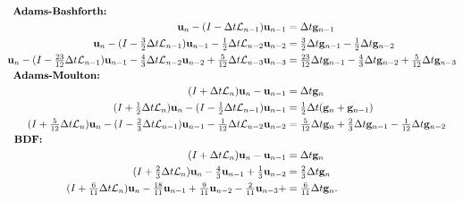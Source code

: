 \documentclass[a4paper,12pt]{article}
\begin{document}
{\small
\begin{align*}
\textnormal{\textbf{Adams-Bashforth:}}\hspace{40.5ex}&\\
\mathbf{u}_n - (I - \Delta t\mathcal{L}_{n-1})\mathbf{u}_{n-1} & =\Delta t\mathbf{g}_{n-1}  \\
\mathbf{u}_n - (I - \tfrac{3}{2}\Delta t\mathcal{L}_{n-1})\mathbf{u}_{n-1} - \tfrac{1}{2}\Delta t\mathcal{L}_{n-2}\mathbf{u}_{n-2} & = \tfrac{3}{2}\Delta t\mathbf{g}_{n-1} - \tfrac{1}{2}\Delta t\mathbf{g}_{n-2}\\
\mathbf{u}_n - (I - \tfrac{23}{12}\Delta t\mathcal{L}_{n-1})\mathbf{u}_{n-1} - \tfrac{4}{3}\Delta t\mathcal{L}_{n-2}\mathbf{u}_{n-2} + 
	\tfrac{5}{12}\Delta t\mathcal{L}_{n-3}\mathbf{u}_{n-3} & = \tfrac{23}{12}\Delta t\mathbf{g}_{n-1} - \tfrac{4}{3}\Delta t\mathbf{g}_{n-2} + 
	\tfrac{5}{12}\Delta t\mathbf{g}_{n-3}\\
\textnormal{\textbf{Adams-Moulton:}}\hspace{42ex}&\\
(I + \Delta t \mathcal{L}_n)\mathbf{u}_n - \mathbf{u}_{n-1} &  =  \Delta t \mathbf{g}_n \\
(I + \tfrac{1}{2}\Delta t \mathcal{L}_n)\mathbf{u}_n - (I - \tfrac{1}{2}\Delta t \mathcal{L}_{n-1})\mathbf{u}_{n-1} & =
	\tfrac{1}{2} \Delta t (\mathbf{g}_n + \mathbf{g}_{n-1}) \\
(I + \tfrac{5}{12}\Delta t \mathcal{L}_n)\mathbf{u}_n - (I - \tfrac{2}{3}\Delta t \mathcal{L}_{n-1})\mathbf{u}_{n-1} - 
	\tfrac{1}{12}\Delta t\mathcal{L}_{n-2}\mathbf{u}_{n-2}& = \tfrac{5}{12} \Delta t\mathbf{g}_n + \tfrac{2}{3} \Delta t\mathbf{g}_{n-1} -
	\tfrac{1}{12} \Delta t\mathbf{g}_{n-2}\\
\textnormal{\textbf{BDF:}}\hspace{55ex}&\\
(I + \Delta t \mathcal{L}_n)\mathbf{u}_n - \mathbf{u}_{n-1} &  =  \Delta t \mathbf{g}_n \\
 (I + \tfrac{2}{3}\Delta t \mathcal{L}_n)\mathbf{u}_{n} - \tfrac{4}{3} \mathbf{u}_{n-1} + \tfrac{1}{3} \mathbf{u}_{n-2} & =
 	\tfrac{2}{3}\Delta t\mathbf{g}_n \\
(I + \tfrac{6}{11}\Delta t \mathcal{L}_n)\mathbf{u}_{n} - \tfrac{18}{11} \mathbf{u}_{n-1} + \tfrac{9}{11} \mathbf{u}_{n-2} -
	\tfrac{2}{11} \mathbf{u}_{n-3} +  & =   \tfrac{6}{11}\Delta t  \mathbf{g}_n.
\end{align*}
}
%
\end{document}
